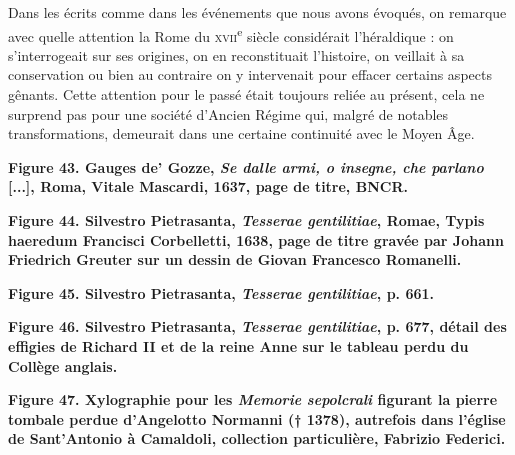 \documentclass[12pt,twoside,openany]{book}
\begin{document}
Dans les écrits comme dans les événements que nous avons évoqués, on remarque avec quelle attention la Rome du \textsc{xvii}\textsuperscript{e} siècle considérait l’héraldique : on s’interrogeait sur ses origines, on en reconstituait l’histoire, on veillait à sa conservation ou bien au contraire on y intervenait pour effacer certains aspects gênants. Cette attention pour le passé était toujours reliée au présent, cela ne surprend pas pour une société d’Ancien Régime qui, malgré de notables transformations, demeurait dans une certaine continuité avec le Moyen Âge.

\begin{center}
\par\small \textbf{Figure 43. Gauges de’ Gozze, \textit{Se dalle armi, o insegne, che parlano }[...], Roma, Vitale Mascardi, 1637, page de titre, BNCR.}
\end{center}

\begin{center}
\par\small \textbf{Figure 44. Silvestro Pietrasanta, \textit{Tesserae gentilitiae}, Romae, Typis haeredum Francisci Corbelletti, 1638, page de titre gravée par Johann Friedrich Greuter sur un dessin de Giovan Francesco Romanelli.}
\end{center}

\begin{center}
\par\small \textbf{Figure 45. Silvestro Pietrasanta, \textit{Tesserae gentilitiae}, p. 661.}
\end{center}

\begin{center}
\par\small \textbf{Figure 46. Silvestro Pietrasanta, \textit{Tesserae gentilitiae}, p. 677, détail des effigies de Richard II et de la reine Anne sur le tableau perdu du Collège anglais.}
\end{center}

\begin{center}
\par\small \textbf{Figure 47. Xylographie pour les \textit{Memorie sepolcrali} figurant la pierre tombale perdue d’Angelotto Normanni († 1378), autrefois dans l’église de Sant’Antonio à Camaldoli, collection particulière, Fabrizio Federici.}
\end{center}
\end{document}
